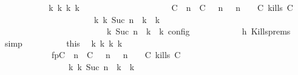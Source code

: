 \begin{isabellebody}
\ \ \ \ \ \ \ \ \isamarkupfalse%
\ \isamarkupfalse%
\ {\isacartoucheopen}{\isasymexists}{\isasymGamma}\isactrlsub k\ {\isasymPsi}\isactrlsub k\ {\isasymPhi}\isactrlsub k\ k{\isachardot}\ {\isacharparenleft}\isanewline
\ \ \ \ \ \ \ \ \ \ \ \ \ \ \ \ \ \ \ \ {\isacharparenleft}{\isacharparenleft}{\isacharparenleft}C\ {\isasymUp}\ n{\isacharparenright}\ {\isacharhash}\ {\isacharparenleft}C\ {\isasymnot}{\isasymUp}\ {\isasymge}\ n{\isacharparenright}\ {\isacharhash}\ {\isasymGamma}{\isacharparenright}{\isacharcomma}\ n\ {\isasymturnstile}\ {\isasymPsi}\ {\isasymtriangleright}\ {\isacharparenleft}{\isacharparenleft}C\ kills\ C\ {\isacharhash}\ {\isasymPhi}{\isacharparenright}{\isacharparenright}\isanewline
\ \ \ \ \ \ \ \ \ \ \ \ \ \ \ \ \ \ \ \ \ \ {\isasymhookrightarrow}\isactrlbsup k\isactrlesup \ {\isacharparenleft}{\isasymGamma}\isactrlsub k{\isacharcomma}\ Suc\ n\ {\isasymturnstile}\ {\isasymPsi}\isactrlsub k\ {\isasymtriangleright}\ {\isasymPhi}\isactrlsub k{\isacharparenright}\isanewline
\ \ \ \ \ \ \ \ \ \ \ \ \ \ \ \ \ \ \ \ {\isacharparenright}\ {\isasymand}\ {\isasymrho}\ {\isasymin}\ {\isasymlbrakk}\ {\isasymGamma}\isactrlsub k{\isacharcomma}\ Suc\ n\ {\isasymturnstile}\ {\isasymPsi}\isactrlsub k\ {\isasymtriangleright}\ {\isasymPhi}\isactrlsub k\ {\isasymrbrakk}\isactrlsub c\isactrlsub o\isactrlsub n\isactrlsub f\isactrlsub i\isactrlsub g{\isacartoucheclose}\isanewline
\ \ \ \ \ \ \ \ \ \ \isamarkupfalse%
\ h{}\ Kills{\isachardot}prems\ \isamarkupfalse%
\ simp\isanewline
\ \ \ \ \ \ \ \ \isamarkupfalse%
\ this\ \isamarkupfalse%
\ {\isasymGamma}\isactrlsub k\ {\isasymPsi}\isactrlsub k\ {\isasymPhi}\isactrlsub k\ k\ \isanewline
\ \ \ \ \ \ \ \ \ \ \ \ fp{\isacharcolon}{\isacartoucheopen}{\isacharparenleft}{\isacharparenleft}{\isacharparenleft}C\ {\isasymUp}\ n{\isacharparenright}\ {\isacharhash}\ {\isacharparenleft}C\ {\isasymnot}{\isasymUp}\ {\isasymge}\ n{\isacharparenright}\ {\isacharhash}\ {\isasymGamma}{\isacharparenright}{\isacharcomma}\ n\ {\isasymturnstile}\ {\isasymPsi}\ {\isasymtriangleright}\ {\isacharparenleft}{\isacharparenleft}C\ kills\ C\ {\isacharhash}\ {\isasymPhi}{\isacharparenright}{\isacharparenright}\isanewline
\ \ \ \ \ \ \ \ \ \ \ \ \ \ \ \ {\isasymhookrightarrow}\isactrlbsup k\isactrlesup \ {\isacharparenleft}{\isasymGamma}\isactrlsub k{\isacharcomma}\ Suc\ n\ {\isasymturnstile}\ {\isasymPsi}\isactrlsub k\ {\isasymtriangleright}\ {\isasymPhi}\isactrlsub k{\isacharparenright}{\isacartoucheclose}\isanewline

\end{isabellebody}
